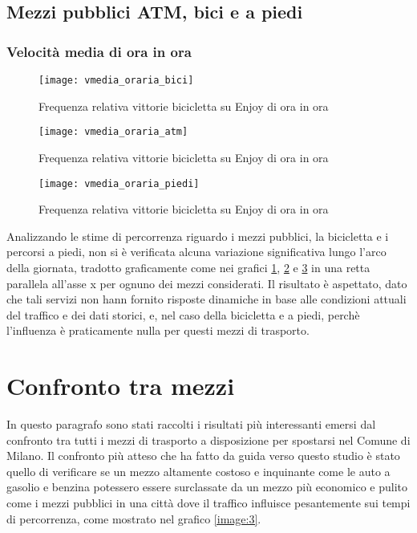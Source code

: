 \subsection{Mezzi pubblici ATM, bici e a piedi}

\subsubsection{Velocità media di ora in ora}

\begin{figure}[H]
	\texttt{[image: vmedia\_oraria\_bici]}
	\caption{Frequenza relativa vittorie bicicletta su Enjoy di ora in ora}
	\label{image:11}
\end{figure}

\begin{figure}[H]
	\texttt{[image: vmedia\_oraria\_atm]}
	\caption{Frequenza relativa vittorie bicicletta su Enjoy di ora in ora}
	\label{image:17}
\end{figure}

\begin{figure}[H]
	\texttt{[image: vmedia\_oraria\_piedi]}
	\caption{Frequenza relativa vittorie bicicletta su Enjoy di ora in ora}
	\label{image:18}
\end{figure}

Analizzando le stime di percorrenza riguardo i mezzi pubblici, la bicicletta e i percorsi a piedi, non si è verificata alcuna variazione significativa lungo l'arco della giornata, tradotto graficamente come nei grafici \ref{image:11}, \ref{image:17} e \ref{image:18} in una retta parallela all'asse x per ognuno dei mezzi considerati. Il risultato è aspettato, dato che tali servizi non hann fornito risposte dinamiche in base alle condizioni attuali del traffico e dei dati storici, e, nel caso della bicicletta e a piedi, perchè l'influenza è praticamente nulla per questi mezzi di trasporto.

\section{Confronto tra mezzi}

In questo paragrafo sono stati raccolti i risultati più interessanti emersi dal confronto tra tutti i mezzi di trasporto a disposizione per spostarsi nel Comune di Milano. Il confronto più atteso che ha fatto da guida verso questo studio è stato quello di verificare se un mezzo altamente costoso e inquinante come le auto a gasolio e benzina potessero essere surclassate da un mezzo più economico e pulito come i mezzi pubblici in una città dove il traffico influisce pesantemente sui tempi di percorrenza, come mostrato nel grafico \ref{image:3}.

